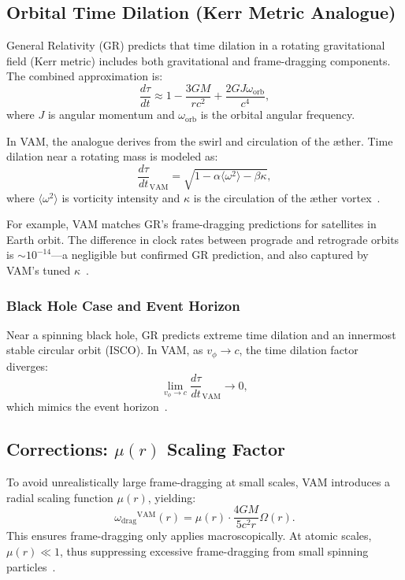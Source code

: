 \documentclass[a4paper, aps,preprint,superscriptaddress, 12pt]{revtex4}
\begin{document}
\subsection{Orbital Time Dilation (Kerr Metric Analogue)}

General Relativity (GR) predicts that time dilation in a rotating gravitational field (Kerr metric) includes both gravitational and frame-dragging components. The combined approximation is:
\[
    \frac{d\tau}{dt} \approx 1 - \frac{3GM}{rc^2} + \frac{2GJ\omega_\text{orb}}{c^4},
\]
where $J$ is angular momentum and $\omega_\text{orb}$ is the orbital angular frequency.

In VAM, the analogue derives from the swirl and circulation of the æther. Time dilation near a rotating mass is modeled as:
\[
    \frac{d\tau}{dt}_\text{VAM} = \sqrt{1 - \alpha \langle \omega^2 \rangle - \beta \kappa},
\]
where $\langle \omega^2 \rangle$ is vorticity intensity and $\kappa$ is the circulation of the æther vortex~\cite{iskandarani2025VAM2}.

For example, VAM matches GR's frame-dragging predictions for satellites in Earth orbit. The difference in clock rates between prograde and retrograde orbits is $\sim 10^{-14}$—a negligible but confirmed GR prediction, and also captured by VAM's tuned $\kappa$~\cite{ashby2003relativity}.

\subsubsection*{Black Hole Case and Event Horizon}

Near a spinning black hole, GR predicts extreme time dilation and an innermost stable circular orbit (ISCO). In VAM, as $v_\phi \rightarrow c$, the time dilation factor diverges:
\[
    \lim_{v_\phi \to c} \frac{d\tau}{dt}_\text{VAM} \to 0,
\]
which mimics the event horizon~\cite{iskandarani2025VAM2}.

\subsection*{Corrections: $\mu(r)$ Scaling Factor}

To avoid unrealistically large frame-dragging at small scales, VAM introduces a radial scaling function $\mu(r)$, yielding:
\[
    {\omega_{\text{drag}}}^{\text{VAM}}(r) = \mu(r) \cdot \frac{4GM}{5c^2 r} \Omega(r).
\]
This ensures frame-dragging only applies macroscopically. At atomic scales, $\mu(r) \ll 1$, thus suppressing excessive frame-dragging from small spinning particles~\cite{iskandarani2025VAM2, adelberger2003tests}.
\end{document}
